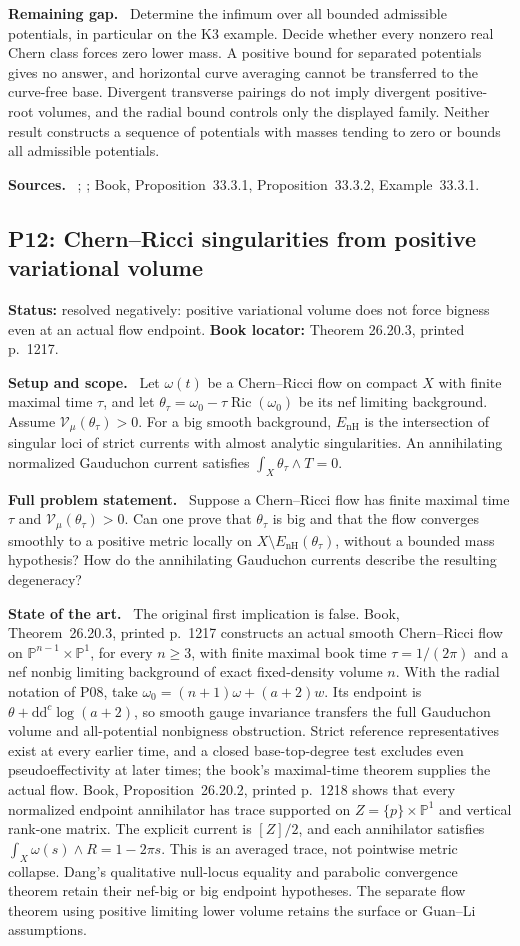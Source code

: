 \documentclass[11pt]{article}
\newcommand{\ddc}{\mathrm d\mathrm d^c}
\newcommand{\field}[1]{\par\medskip\noindent\textbf{#1.}\ }
\begin{document}
\field{Remaining gap} Determine the infimum over all bounded admissible potentials, in particular on the K3 example. Decide whether every nonzero real Chern class forces zero lower mass. A positive bound for separated potentials gives no answer, and horizontal curve averaging cannot be transferred to the curve-free base. Divergent transverse pairings do not imply divergent positive-root volumes, and the radial bound controls only the displayed family. Neither result constructs a sequence of potentials with masses tending to zero or bounds all admissible potentials.
\field{Sources} \cite[Section 2]{GP04}; \cite[Theorems 7.4.1 and 8.5.2 in the author draft]{HuyK3}; Book, Proposition~33.3.1, Proposition~33.3.2, Example~33.3.1.
\subsection{P12: Chern--Ricci singularities from positive variational volume}
\label{P12}
\noindent\textbf{Status:} resolved negatively: positive variational volume does not force bigness even at an actual flow endpoint. \textbf{Book locator:} Theorem 26.20.3, printed p.~1217.
\field{Setup and scope} Let $\omega(t)$ be a Chern--Ricci flow on compact $X$ with finite maximal time $\tau$, and let $\theta_\tau=\omega_0-\tau\operatorname{Ric}(\omega_0)$ be its nef limiting background. Assume $\mathcal V_\mu(\theta_\tau)>0$. For a big smooth background, $E_{\mathrm{nH}}$ is the intersection of singular loci of strict currents with almost analytic singularities. An annihilating normalized Gauduchon current satisfies $\int_X\theta_\tau\wedge T=0$.
\field{Full problem statement} Suppose a Chern--Ricci flow has finite maximal time $\tau$ and $\mathcal V_\mu(\theta_\tau)>0$. Can one prove that $\theta_\tau$ is big and that the flow converges smoothly to a positive metric locally on $X\setminus E_{\mathrm{nH}}(\theta_\tau)$, without a bounded mass hypothesis? How do the annihilating Gauduchon currents describe the resulting degeneracy?
\field{State of the art} The original first implication is false. Book, Theorem~26.20.3, printed p.~1217 constructs an actual smooth Chern--Ricci flow on $\mathbb P^{n-1}\times\mathbb P^1$, for every $n\geq3$, with finite maximal book time $\tau=1/(2\pi)$ and a nef nonbig limiting background of exact fixed-density volume $n$. With the radial notation of P08, take $\omega_0=(n+1)\omega+(a+2)w$. Its endpoint is $\theta+\ddc\log(a+2)$, so smooth gauge invariance transfers the full Gauduchon volume and all-potential nonbigness obstruction. Strict reference representatives exist at every earlier time, and a closed base-top-degree test excludes even pseudoeffectivity at later times; the book's maximal-time theorem supplies the actual flow. Book, Proposition~26.20.2, printed p.~1218 shows that every normalized endpoint annihilator has trace supported on $Z=\{p\}\times\mathbb P^1$ and vertical rank-one matrix. The explicit current is $[Z]/2$, and each annihilator satisfies $\int_X\omega(s)\wedge R=1-2\pi s$. This is an averaged trace, not pointwise metric collapse. Dang's qualitative null-locus equality and parabolic convergence theorem retain their nef-big or big endpoint hypotheses. The separate flow theorem using positive limiting lower volume retains the surface or Guan--Li assumptions.
\end{document}
